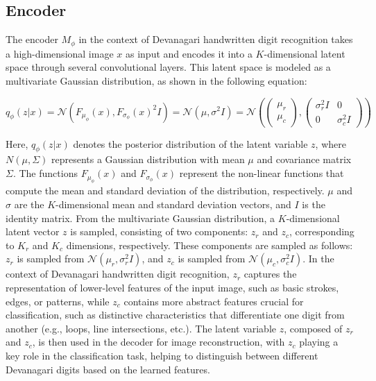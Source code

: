 \documentclass[9pt,a4paper,twoside]{rho-class/rho}
\begin{document}
    \subsection{Encoder}
    The encoder \( M_\phi \) in the context of Devanagari handwritten digit recognition takes a high-dimensional image \( x \) as input and encodes it into a \( K \)-dimensional latent space through several convolutional layers. This latent space is modeled as a multivariate Gaussian distribution, as shown in the following equation:

\[
q_\phi(z|x) = \mathcal{N}(F_{\mu_\phi}(x), F_{\sigma_\phi}(x)^2 I) = \mathcal{N}(\mu, \sigma^2 I) = \mathcal{N}\left(\begin{pmatrix} \mu_r \\ \mu_c \end{pmatrix}, \begin{pmatrix} \sigma_r^2 I & 0 \\ 0 & \sigma_c^2 I \end{pmatrix}\right)
\]

Here, \( q_\phi(z|x) \) denotes the posterior distribution of the latent variable \( z \), where \( N(\mu, \Sigma) \) represents a Gaussian distribution with mean \( \mu \) and covariance matrix \( \Sigma \). The functions \( F_{\mu_\phi}(x) \) and \( F_{\sigma_\phi}(x) \) represent the non-linear functions that compute the mean and standard deviation of the distribution, respectively. \( \mu \) and \( \sigma \) are the \( K \)-dimensional mean and standard deviation vectors, and \( I \) is the identity matrix. From the multivariate Gaussian distribution, a \( K \)-dimensional latent vector \( z \) is sampled, consisting of two components: \( z_r \) and \( z_c \), corresponding to \( K_r \) and \( K_c \) dimensions, respectively. These components are sampled as follows: \( z_r \) is sampled from \( \mathcal{N}(\mu_r, \sigma_r^2 I) \), and \( z_c \) is sampled from \( \mathcal{N}(\mu_c, \sigma_c^2 I) \). In the context of Devanagari handwritten digit recognition, \( z_r \) captures the representation of lower-level features of the input image, such as basic strokes, edges, or patterns, while \( z_c \) contains more abstract features crucial for classification, such as distinctive characteristics that differentiate one digit from another (e.g., loops, line intersections, etc.). The latent variable \( z \), composed of \( z_r \) and \( z_c \), is then used in the decoder for image reconstruction, with \( z_c \) playing a key role in the classification task, helping to distinguish between different Devanagari digits based on the learned features.
\end{document}
